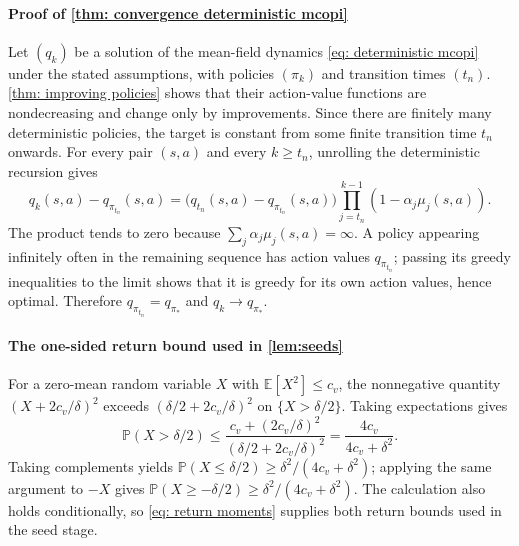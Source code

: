 \documentclass[twoside,11pt]{article}
\DeclareRobustCommand{\reviewbarstart}{%
  \ifhmode %
    \vadjust{\vbox to 0pt{%
      \vskip-\ht\strutbox %
      \vskip-\dp\strutbox %
      \cbstart[\changebarwidth] %
      \vss %
    }}%
  \else %
    \cbstart[\changebarwidth]%
  \fi %
} %
\providecommand{\DIFadd}[1]{#1} %
\providecommand{\DIFaddbegin}{\reviewbarstart} %
\providecommand{\DIFaddend}{\protect\cbend} %
\def\DIFadd#1{#1}%
\def\DIFaddbegin{}%
\def\DIFaddend{}%
\begin{document}
 \DIFaddbegin \paragraph{\DIFadd{Proof of \autoref{thm: convergence deterministic mcopi}}}
\DIFadd{Let $(q_k)$ be a solution of the mean-field dynamics \eqref{eq: deterministic mcopi} under the stated assumptions, with policies $(\pi_k)$ and transition times $(t_n)$.
\autoref{thm: improving policies} shows that their action-value functions are nondecreasing and change only by improvements. Since there are finitely many deterministic policies, the target is constant from some finite transition time $t_n$ onwards.
For every pair $(s,a)$ and every $k\ge t_n$, unrolling the deterministic recursion gives
}\[
\DIFadd{q_k(s,a)-q_{\pi_{t_n}}(s,a)
=\big(q_{t_n}(s,a)-q_{\pi_{t_n}}(s,a)\big)
\prod_{j=t_n}^{k-1}(1-\alpha_j\mu_j(s,a)).
}\]
\DIFadd{The product tends to zero because $\sum_j\alpha_j\mu_j(s,a)=\infty$.
A policy appearing infinitely often in the remaining sequence has action values $q_{\pi_{t_n}}$; passing its greedy inequalities to the limit shows that it is greedy for its own action values, hence optimal. Therefore $q_{\pi_{t_n}}=q_{\pi_*}$ and $q_k\to q_{\pi_*}$.
}\DIFaddend \hfill\BlackBox

\DIFaddbegin \paragraph{\DIFadd{The one-sided return bound used in \autoref{lem:seeds}}}
\DIFadd{For a zero-mean random variable $X$ with $\mathbb E[X^2]\le c_v$, the nonnegative quantity $(X+2c_v/\delta)^2$ exceeds $(\delta/2+2c_v/\delta)^2$ on $\{X>\delta/2\}$. Taking expectations gives
}\[
\DIFadd{\mathbb P(X>\delta/2)
\le\frac{c_v+(2c_v/\delta)^2}{(\delta/2+2c_v/\delta)^2}
=\frac{4c_v}{4c_v+\delta^2}.
}\]
\DIFadd{Taking complements yields $\mathbb P(X\le\delta/2)\ge\delta^2/(4c_v+\delta^2)$; applying the same argument to $-X$ gives $\mathbb P(X\ge-\delta/2)\ge\delta^2/(4c_v+\delta^2)$. The calculation also holds conditionally, so \eqref{eq: return moments} supplies both return bounds used in the seed stage.
}\DIFaddend 
\end{document}
